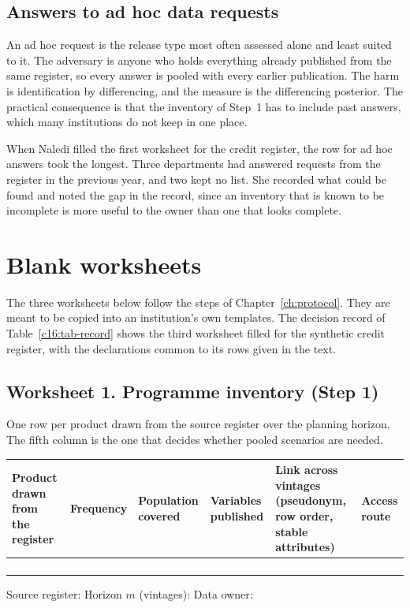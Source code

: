 \subsection*{Answers to ad hoc data requests}

An ad hoc request is the release type most often assessed alone and least suited to
it. The adversary is anyone who holds everything already published from the same
register, so every answer is pooled with every earlier publication. The harm is
identification by differencing, and the measure is the differencing posterior. The
practical consequence is that the inventory of Step~1 has to include past answers,
which many institutions do not keep in one place.

When Naledi filled the first worksheet for the credit register, the row for ad hoc
answers took the longest. Three departments had answered requests from the register
in the previous year, and two kept no list. She recorded what could be found and
noted the gap in the record, since an inventory that is known to be incomplete is
more useful to the owner than one that looks complete.

\section{Blank worksheets}

The three worksheets below follow the steps of Chapter~\ref{ch:protocol}. They are
meant to be copied into an institution's own templates. The decision record of
Table~\ref{c16:tab-record} shows the third worksheet filled for the synthetic credit
register, with the declarations common to its rows given in the text.

\subsection*{Worksheet 1. Programme inventory (Step 1)}

One row per product drawn from the source register over the planning horizon. The
fifth column is the one that decides whether pooled scenarios are needed.

\begin{center}
\footnotesize
\setlength{\tabcolsep}{3pt}
\begin{tabular}{@{}>{\raggedright\arraybackslash}p{2.6cm}>{\raggedright\arraybackslash}p{1.7cm}>{\raggedright\arraybackslash}p{2.3cm}>{\raggedright\arraybackslash}p{2.6cm}>{\raggedright\arraybackslash}p{3.0cm}>{\raggedright\arraybackslash}p{2.1cm}@{}}
\toprule
Product drawn from the register & Frequency & Population covered & Variables
published & Link across vintages (pseudonym, row order, stable attributes) & Access
route \\
\midrule
 & & & & & \\[12pt]
 & & & & & \\[12pt]
 & & & & & \\[12pt]
 & & & & & \\[12pt]
\bottomrule
\end{tabular}
\end{center}
\noindent Source register: \hrulefill\quad Horizon $m$ (vintages): \hrulefill\quad
Data owner: \hrulefill

